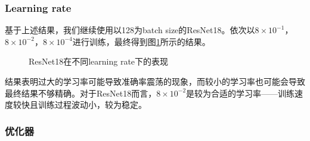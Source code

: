 \documentclass[hyperref, UTF8, 12pt]{article}
\theoremstyle{definition}
\begin{document}
\subsubsection{Learning rate}
基于上述结果，我们继续使用以128为batch size的ResNet18。依次以$8\times10^{-1}$，$8\times10^{-2}$，$8\times10^{-4}$进行训练，最终得到图\ref{fig:resnet18_lr}所示的结果。
\begin{figure}[H]
	\centering
	\caption{ResNet18在不同learning rate下的表现}
	\label{fig:resnet18_lr}
\end{figure}
结果表明过大的学习率可能导致准确率震荡的现象，而较小的学习率也可能会导致最终结果不够精确。对于ResNet18而言，$8\times10^{-2}$是较为合适的学习率——训练速度较快且训练过程波动小，较为稳定。
\subsubsection{优化器}
\end{document}

